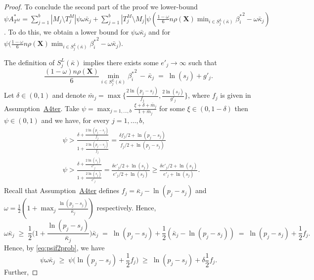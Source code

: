 \documentclass[
  12pt]{article}
\newcommand{\bX}{\mathbf{X}}
\begin{document}
\begin{proof}
To conclude the second part of the proof we lower-bound $\psi A^*_{T^M}=\sum_{j=1}^b|M_j \setminus T^M_j|\psi\omega\bar{\kappa}_j + \sum_{j=1}^b |T^M_j \setminus M_j|\psi\left(\tfrac{1-\omega}{6} n \rho(\bX) \min_{i\in S^{L}_j(\bar{\kappa})}{\beta^*_i}^{2} - \omega\bar{\kappa}_j\right)$. To do this, we obtain a lower bound for $\psi \omega \bar{\kappa}_j$ and for $\psi\bigg(\tfrac{1-\omega}{6} n \rho(\bX) \min_{i\in S^{L}_j(\bar{\kappa})}{\beta^*_i}^{2} - \omega\bar{\kappa}_j\bigg)$.


The definition of $S^{L}_j(\bar{\kappa})$ implies there exists some $e'_j \to \infty$ such that
\begin{equation}\label{eq:bngrwsprob}
  \frac{(1-\omega) n\rho(\bX)}{6}\min_{i\in S^{L}_j(\bar{\kappa})}{\beta^*_i}^{2}\,- \,\bar{\kappa}_j \;=\; \ln(s_j) + g'_{j}.  
\end{equation}
Let $\delta \in (0,1)$ and denote $\bar{m}_j=\max\big\{\frac{2\ln(p_j-s_j)}{f_j},\frac{2\ln(s_j)}{g'_{j}}\big\}$, where $f_j$ is given in Assumption~\hyperlink{lab:A4ter}{A4ter}. 
Take $\psi=\max_{j=1,\ldots,b}\frac{\xi + \delta + \bar{m}_j}{1+\bar{m}_j}$ for some $\xi \in(0, 1- \delta)$ then $\psi \in (0,1)$ and we have, for every $j=1,\ldots,b$,
\begin{align}
    &\psi > \frac{\delta + \frac{2\ln(p_j-s_j)}{f_j}}{1+\frac{2\ln(p_j-s_j)}{f_j}} = \frac{\delta f_j/2 + \ln(p_j-s_j)}{f_j/2 +\ln(p_j-s_j)} \label{eq:psif2prob}\\
    &\psi > \frac{\delta + \frac{2\ln(s_j)}{e'_j}}{1+\frac{2\ln(s_j)}{e'_j}} = \frac{\delta e'_j/2 + \ln(s_j)}{e'_j/2 +\ln(s_j)} \geq \frac{\delta e'_j/2 + \ln(s_j)}{e'_j +\ln(s_j)}.\label{eq:psig2prob}
\end{align}
 Recall that Assumption~\hyperlink{lab:A4ter}{A4ter} defines $f_j= \bar{\kappa}_j - \ln(p_j-s_j)$ and $\omega= \frac{1}{2}(1 + \max_j \frac{\ln(p_j-s_j)}{\bar{\kappa}_j})$ respectively. Hence,
$$
\omega\bar{\kappa}_j\;\geq\;\frac12 \Big(1+\frac{\ln(p_j-s_j)}{\bar{\kappa}_j}\Big)\bar{\kappa}_j\;=\;\ln(p_j-s_j)+\frac12(\bar{\kappa}_j-\ln(p_j-s_j)) \;=\; \ln(p_j-s_j)+ \frac12f_j.
$$
Hence, by \eqref{eq:psif2prob}, we have
\begin{equation}\label{eq:ooofjfj3prob}
\psi\omega\bar{\kappa}_j \;\geq\; \psi\big(\ln(p_j-s_j)+ \frac12f_j\big) \;\geq\;  \ln(p_j-s_j)+ \delta\frac12f_j.
\end{equation}
Further,

\end{proof}
\end{document}
